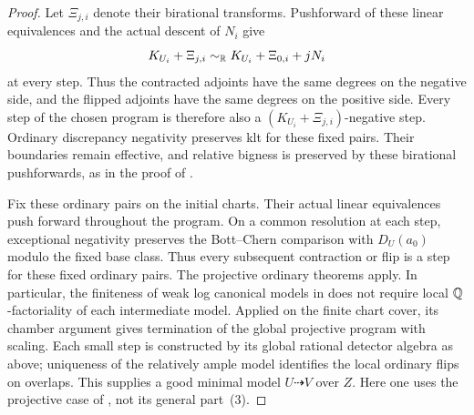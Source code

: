 \begin{proof}
Let $\Xi_{j,i}$ denote their birational transforms. Pushforward of
these linear equivalences and the actual descent of $N_i$ give
\[
 K_{U_i}+\Xi_{j,i}
 \sim_{\mathbb R}K_{U_i}+\Xi_{0,i}+jN_i
\]
at every step. Thus the contracted adjoints have the same degrees
on the negative side, and the flipped adjoints have the same degrees
on the positive side. Every step of the chosen program is therefore
also a $(K_{U_i}+\Xi_{j,i})$-negative step. Ordinary discrepancy
negativity preserves klt for these fixed pairs. Their boundaries
remain effective, and relative bigness is preserved by these
birational pushforwards, as in the proof of
\cite[Lemma~11.16]{Fujino2022}.

Fix these ordinary pairs on the initial charts. Their actual
linear equivalences push forward throughout the program. On a
common resolution at each step, exceptional negativity preserves
the Bott--Chern comparison with $D_U(a_0)$ modulo the fixed base
class. Thus every subsequent contraction or flip is a step for
these fixed ordinary pairs. The projective ordinary theorems
\cite{Fujino2022,FujinoCompact2026} apply. In particular, the finiteness
of weak log canonical models in \cite[Theorem~E]{Fujino2022} does not
require local $\mathbb Q$-factoriality of each intermediate model. Applied
on the finite chart cover, its chamber argument gives termination
of the global projective program with scaling. Each small step
is constructed by its global rational detector algebra as above;
uniqueness of the relatively ample model identifies the local
ordinary flips on overlaps. This supplies a good
minimal model $U\dasharrow V$ over $Z$. Here one uses the projective case of
\cite[Proposition~2.30]{HX2026}, not its general part~(3).


\end{proof}
